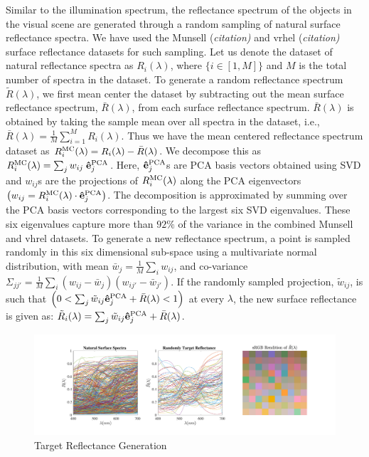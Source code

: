 \documentclass{jov}
\begin{document}
Similar to the illumination spectrum, the reflectance spectrum of the 
objects in the visual scene are generated through a random 
sampling of natural surface reflectance spectra. We have used 
the Munsell {(\it citation)} and vrhel {(\it citation)} surface reflectance 
datasets for such sampling. Let us denote the dataset of natural 
reflectance spectra as $R_i(\lambda)$, where $\{i \in [1,M]\}$ 
and $M$ is the total number of spectra in the dataset. To generate 
a random reflectance spectrum $\tilde{R}(\lambda)$, 
we first mean center the dataset by subtracting out the 
mean surface reflectance spectrum, $\bar{R}(\lambda)$,
from each surface reflectance spectrum.
$\bar{R}(\lambda)$ is obtained by taking the sample 
mean over all spectra in the dataset, i.e.,
$\bar{R}(\lambda) = \frac{1}{M} \sum_{i=1}^M R_i(\lambda)$. 
Thus we have the mean centered reflectance 
spectrum dataset as $R_i^{\rm MC}(\lambda) =  R_i(\lambda)-\bar{R}(\lambda)$. 
We decompose this as $R_i^{\rm MC}(\lambda) = \sum_j{w_{ij} \; {\bf \hat{e}}_j^{\rm PCA}}$. Here,
${\bf \hat{e}}_j^{\rm PCA}$s are PCA basis vectors obtained using SVD 
and $w_{ij}$s are the projections of $R_i^{\rm MC}(\lambda)$ along the PCA eigenvectors 
$\left( w_{ij} = R_i^{\rm MC}(\lambda)\cdot {\bf \hat{e}}_j^{\rm PCA}\right)$. The 
decomposition is approximated by summing over the PCA basis 
vectors corresponding to the largest six SVD eigenvalues. These six eigenvalues capture 
more than $92\%$ of the variance in the combined Munsell and vhrel datasets. To generate 
a new reflectance spectrum, a point is sampled randomly in this 
six dimensional sub-space using a multivariate normal 
distribution, with mean $\bar{w}_j = \frac{1}{M}\sum_i w_{ij}$, 
and co-variance $\Sigma_{jj'} = \frac{1}{M} \sum_i \left(w_{ij} -\bar{w}_j\right)\left(w_{ij'} -\bar{w}_{j'}\right) $. If the randomly sampled projection, $\tilde{w}_{ij}$, is 
such that $\left( 0 < \sum_j \tilde{w}_{ij}{\bf \hat{e}}_j^{\rm PCA} + \bar{R}(\lambda)<1\right) $ at every $\lambda$, the new surface reflectance 
is given as: $\tilde{R}_i(\lambda) =\sum_j \tilde{w}_{ij}{\bf \hat{e}}_j^{\rm PCA} + \bar{R}(\lambda)$.

\begin{figure}
\centering
	\includegraphics[width=\textwidth]{Figure16/target.pdf}
    \caption{Target Reflectance Generation}
    \label{fig:targetGeneration}
\end{figure}
\end{document}
